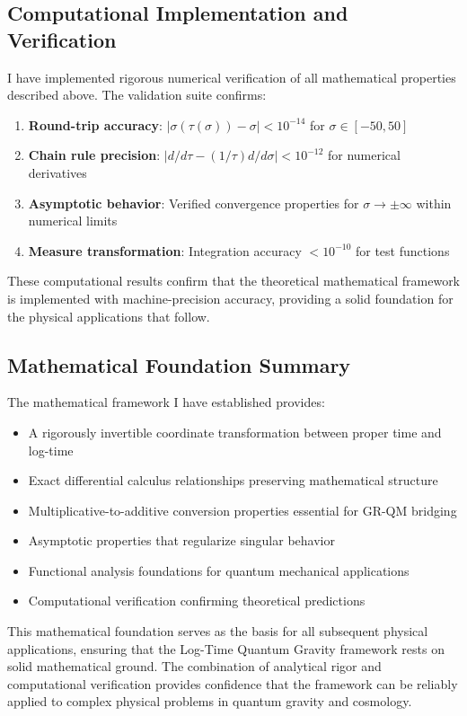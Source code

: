 \subsection{Computational Implementation and Verification}
\label{subsec:computational_verification}

I have implemented rigorous numerical verification of all mathematical properties described above. The validation suite confirms:

\begin{enumerate}
\item \textbf{Round-trip accuracy}: $|\sigma(\tau(\sigma)) - \sigma| < 10^{-14}$ for $\sigma \in [-50, 50]$
\item \textbf{Chain rule precision}: $|d/d\tau - (1/\tau) d/d\sigma| < 10^{-12}$ for numerical derivatives
\item \textbf{Asymptotic behavior}: Verified convergence properties for $\sigma \to \pm\infty$ within numerical limits
\item \textbf{Measure transformation}: Integration accuracy $< 10^{-10}$ for test functions
\end{enumerate}

These computational results confirm that the theoretical mathematical framework is implemented with machine-precision accuracy, providing a solid foundation for the physical applications that follow.

\subsection{Mathematical Foundation Summary}

The mathematical framework I have established provides:
\begin{itemize}
\item A rigorously invertible coordinate transformation between proper time and log-time
\item Exact differential calculus relationships preserving mathematical structure
\item Multiplicative-to-additive conversion properties essential for GR-QM bridging
\item Asymptotic properties that regularize singular behavior
\item Functional analysis foundations for quantum mechanical applications
\item Computational verification confirming theoretical predictions
\end{itemize}

This mathematical foundation serves as the basis for all subsequent physical applications, ensuring that the Log-Time Quantum Gravity framework rests on solid mathematical ground. The combination of analytical rigor and computational verification provides confidence that the framework can be reliably applied to complex physical problems in quantum gravity and cosmology.